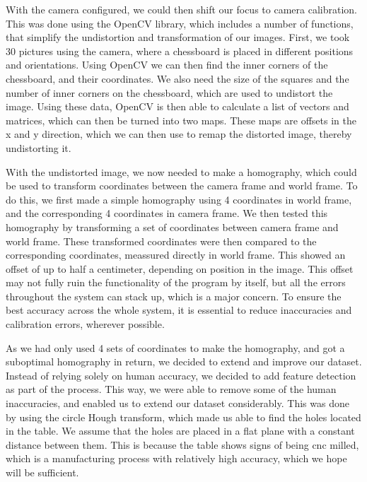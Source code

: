 With the camera configured, we could then shift our focus to camera calibration.
This was done using the OpenCV library, which includes a number of functions, that simplify the undistortion and transformation of our images.
First, we took 30 pictures using the camera, where a chessboard is placed in different positions and orientations. 
Using OpenCV we can then find the inner corners of the chessboard, and their coordinates.
We also need the size of the squares and the number of inner corners on the chessboard, which are used to undistort the image.
Using these data, OpenCV is then able to calculate a list of vectors and matrices, which can then be turned into two maps.
These maps are offsets in the x and y direction, which we can then use to remap the distorted image, thereby undistorting it.

With the undistorted image, we now needed to make a homography, which could be used to transform coordinates between the camera frame and world frame.
To do this, we first made a simple homography using 4 coordinates in world frame, and the corresponding 4 coordinates in camera frame.
We then tested this homography by transforming a set of coordinates between camera frame and world frame.
These transformed coordinates were then compared to the corresponding coordinates, meassured directly in world frame.
This showed an offset of up to half a centimeter, depending on position in the image.
This offset may not fully ruin the functionality of the program by itself, but all the errors throughout the system can stack up, which is a major concern.
To ensure the best accuracy across the whole system, it is essential to reduce inaccuracies and calibration errors, wherever possible. 

As we had only used 4 sets of coordinates to make the homography, and got a suboptimal homography in return, we decided to extend and improve our dataset.
Instead of relying solely on human accuracy, we decided to add feature detection as part of the process.
This way, we were able to remove some of the human inaccuracies, and enabled us to extend our dataset considerably.
This was done by using the circle Hough transform, which made us able to find the holes located in the table. 
We assume that the holes are placed in a flat plane with a constant distance between them.
This is because the table shows signs of being cnc milled, which is a manufacturing process with relatively high accuracy, which we hope will be sufficient.

